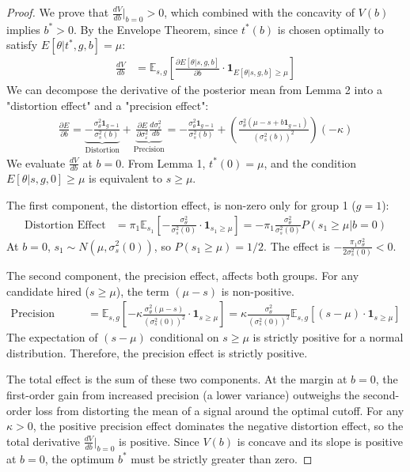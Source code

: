 \begin{proof}
We prove that $\frac{dV}{db}\big|_{b=0} > 0$, which combined with the concavity of $V(b)$ implies $b^* > 0$. By the Envelope Theorem, since $t^*(b)$ is chosen optimally to satisfy $E[\theta|t^*, g, b] = \mu$:
\begin{align}
\frac{dV}{db} &= \mathbb{E}_{s,g}\left[\frac{\partial E[\theta | s, g, b]}{\partial b} \cdot \mathbf{1}_{E[\theta|s,g,b] \ge \mu}\right] \label{eq:dv_db_general}
\end{align}
We can decompose the derivative of the posterior mean from Lemma 2 into a "distortion effect" and a "precision effect":
\begin{align}
\frac{\partial E}{\partial b} = \underbrace{-\frac{\sigma_\theta^2 \mathbf{1}_{g=1}}{\sigma_s^2(b)}}_{\text{Distortion}} + \underbrace{\frac{\partial E}{\partial \sigma_\varepsilon^2} \frac{d\sigma_\varepsilon^2}{db}}_{\text{Precision}} = -\frac{\sigma_\theta^2 \mathbf{1}_{g=1}}{\sigma_s^2(b)} + \left(\frac{\sigma_\theta^2(\mu - s + b \mathbf{1}_{g=1})}{(\sigma_s^2(b))^2}\right) (-\kappa)
\end{align}
We evaluate $\frac{dV}{db}$ at $b=0$. From Lemma 1, $t^*(0)=\mu$, and the condition $E[\theta|s,g,0] \ge \mu$ is equivalent to $s \ge \mu$.

The first component, the distortion effect, is non-zero only for group 1 ($g=1$):
\begin{align}
\text{Distortion Effect} &= \pi_1 \mathbb{E}_{s_1}\left[-\frac{\sigma_\theta^2}{\sigma_s^2(0)} \cdot \mathbf{1}_{s_1 \ge \mu}\right] = -\pi_1 \frac{\sigma_\theta^2}{\sigma_s^2(0)} P(s_1 \ge \mu | b=0)
\end{align}
At $b=0$, $s_1 \sim N(\mu, \sigma_s^2(0))$, so $P(s_1 \ge \mu) = 1/2$. The effect is $-\frac{\pi_1 \sigma_\theta^2}{2\sigma_s^2(0)} < 0$.

The second component, the precision effect, affects both groups. For any candidate hired ($s \ge \mu$), the term $(\mu-s)$ is non-positive.
\begin{align}
\text{Precision Effect} &= \mathbb{E}_{s,g}\left[-\kappa \frac{\sigma_\theta^2(\mu-s)}{(\sigma_s^2(0))^2} \cdot \mathbf{1}_{s \ge \mu}\right] = \kappa \frac{\sigma_\theta^2}{(\sigma_s^2(0))^2} \mathbb{E}_{s,g}\left[(s-\mu) \cdot \mathbf{1}_{s \ge \mu}\right]
\end{align}
The expectation of $(s-\mu)$ conditional on $s \ge \mu$ is strictly positive for a normal distribution. Therefore, the precision effect is strictly positive.

The total effect is the sum of these two components. At the margin at $b=0$, the first-order gain from increased precision (a lower variance) outweighs the second-order loss from distorting the mean of a signal around the optimal cutoff. For any $\kappa > 0$, the positive precision effect dominates the negative distortion effect, so the total derivative $\frac{dV}{db}\big|_{b=0}$ is positive. Since $V(b)$ is concave and its slope is positive at $b=0$, the optimum $b^*$ must be strictly greater than zero.
\end{proof}



